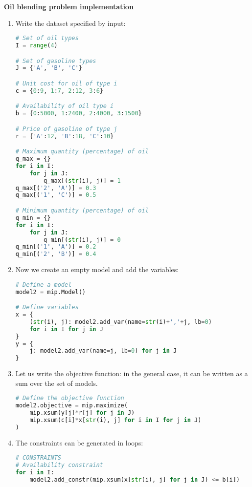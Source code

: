 \highspace
\begin{flushleft}
    \textcolor{Green3}{ \textbf{Oil blending problem implementation}}
\end{flushleft}
\begin{enumerate}
    \item Write the dataset specified by input:
    \begin{lstlisting}[language=Python]
# Set of oil types
I = range(4)

# Set of gasoline types
J = {'A', 'B', 'C'}

# Unit cost for oil of type i 
c = {0:9, 1:7, 2:12, 3:6}

# Availability of oil type i
b = {0:5000, 1:2400, 2:4000, 3:1500}

# Price of gasoline of type j
r = {'A':12, 'B':18, 'C':10}

# Maximum quantity (percentage) of oil
q_max = {}
for i in I:
    for j in J:
        q_max[(str(i), j)] = 1
q_max[('2', 'A')] = 0.3
q_max[('1', 'C')] = 0.5

# Minimum quantity (percentage) of oil
q_min = {}
for i in I:
    for j in J:
        q_min[(str(i), j)] = 0
q_min[('1', 'A')] = 0.2
q_min[('2', 'B')] = 0.4\end{lstlisting}

    \item Now we create an empty model and add the variables:
    \begin{lstlisting}[language=Python]
# Define a model
model2 = mip.Model()

# Define variables
x = {
    (str(i), j): model2.add_var(name=str(i)+','+j, lb=0)
    for i in I for j in J
}
y = {
    j: model2.add_var(name=j, lb=0) for j in J
}\end{lstlisting}

    \item Let us write the objective function: in the general case, it can be written as a sum over the set of models.
    \begin{lstlisting}[language=Python]
# Define the objective function
model2.objective = mip.maximize(
    mip.xsum(y[j]*r[j] for j in J) - 
    mip.xsum(c[i]*x[str(i), j] for i in I for j in J)
)\end{lstlisting}

    \item The constraints can be generated in loops:
    \begin{lstlisting}[language=Python]
# CONSTRAINTS
# Availability constraint
for i in I:
    model2.add_constr(mip.xsum(x[str(i), j] for j in J) <= b[i])


\end{lstlisting}
\end{enumerate}
